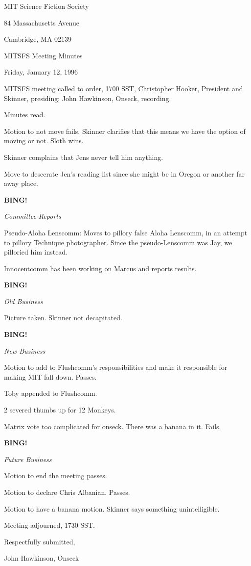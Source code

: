 \documentclass[12pt]{article}
\newcommand{\bing}{{\bf BING!} }
\newcommand{\goto}[1]{\bing \vskip 12pt \centerline{{\em{#1}}}}
\begin{document}
\begin{center}

MIT Science Fiction Society 

84 Massachusetts Avenue

Cambridge, MA 02139

\vspace{12pt}

MITSFS Meeting Minutes 

Friday, January 12, 1996

\end{center}
 
\vspace{18pt}

\setlength{\parskip}{6pt}

\noindent
MITSFS meeting called to order, 1700 SST,
Christopher Hooker, President and Skinner, presiding; John Hawkinson, Onseck, recording.

Minutes read.

Motion to not move fails. Skinner clarifies that this means we have the option of moving or not. Sloth wins.

Skinner complains that Jens never tell him anything.

Move to desecrate Jen's reading list since she might be in Oregon or another far away place.

\goto{Committee Reports}

Pseudo-Aloha Lenscomm: Moves to pillory false Aloha Lenscomm, in an attempt to pillory Technique photographer. Since the pseudo-Lenscomm was Jay, we pilloried him instead.

Innocentcomm has been working on Marcus and reports results.

\goto{Old Business}

Picture taken. Skinner not decapitated.

\goto{New Business}

Motion to add to Flushcomm's responsibilities and make it responsible for making MIT fall down. Passes.

Toby appended to Flushcomm.

2 severed thumbs up for 12 Monkeys.

Matrix vote too complicated for onseck. There was a banana in it. Fails.

\goto{Future Business}

Motion to end the meeting passes.

Motion to declare Chris Albanian. Passes.

Motion to have a banana motion. Skinner says something unintelligible.

\vspace{12pt}

\noindent
Meeting adjourned, 1730 SST.

\vspace{18pt}

\centerline{Respectfully submitted,}
\centerline{John Hawkinson, Onseck}
\end{document}
